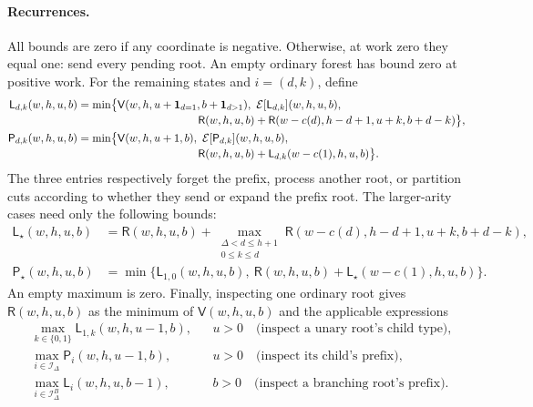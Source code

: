 \documentclass[10pt]{article}
\begin{document}
\paragraph{Recurrences.} All bounds are zero if any coordinate is negative. Otherwise, at work zero they equal one: send every pending root. An empty ordinary forest has bound zero at positive work. For the remaining states and $i=(d,k)$, define
\begin{align*}
 \mathsf L_{d,k}(w,h,u,b)&=\min\bigl\{\mathsf V(w,h,u+\mathbf1_{d=1},b+\mathbf1_{d>1}),\ \mathcal E[\mathsf L_{d,k}](w,h,u,b),\\[-2pt]
 &\hspace{38mm}\mathsf R(w,h,u,b)+\mathsf R(w-c(d),h-d+1,u+k,b+d-k)\bigr\},\\
 \mathsf P_{d,k}(w,h,u,b)&=\min\bigl\{\mathsf V(w,h,u+1,b),\ \mathcal E[\mathsf P_{d,k}](w,h,u,b),\\[-2pt]
 &\hspace{38mm}\mathsf R(w,h,u,b)+\mathsf L_{d,k}(w-c(1),h,u,b)\bigr\}.
\end{align*}
The three entries respectively forget the prefix, process another root, or partition cuts according to whether they send or expand the prefix root. The larger-arity cases need only the following bounds:
\begin{align*}
 \mathsf L_\star(w,h,u,b)&=\mathsf R(w,h,u,b)+\max_{\substack{\Delta<d\le h+1\\0\le k\le d}}\mathsf R(w-c(d),h-d+1,u+k,b+d-k),\\
 \mathsf P_\star(w,h,u,b)&=\min\bigl\{\mathsf L_{1,0}(w,h,u,b),\ \mathsf R(w,h,u,b)+\mathsf L_\star(w-c(1),h,u,b)\bigr\}.
\end{align*}
An empty maximum is zero. Finally, inspecting one ordinary root gives $\mathsf R(w,h,u,b)$ as the minimum of $\mathsf V(w,h,u,b)$ and the applicable expressions
\begin{align*}
 &\max_{k\in\{0,1\}}\mathsf L_{1,k}(w,h,u-1,b), &&u>0 \quad\text{(inspect a unary root's child type)},\\
 &\max_{i\in\mathcal I_\Delta}\mathsf P_i(w,h,u-1,b), &&u>0 \quad\text{(inspect its child's prefix)},\\
 &\max_{i\in\mathcal I_\Delta^B}\mathsf L_i(w,h,u,b-1), &&b>0 \quad\text{(inspect a branching root's prefix)}.
\end{align*}
\end{document}
